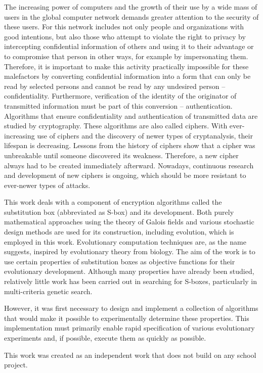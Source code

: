 %
%
%
%
%
%
The increasing power of computers and the growth of their use by a wide mass of users in the global computer network
demands greater attention to the security of these users.
For this network includes
not only people and organizations with good intentions, but also those who attempt
to violate the right to privacy by intercepting confidential
information of others and using it to their advantage or to compromise that person in other ways, for example
by impersonating them. Therefore, it is important to make this activity practically impossible for these malefactors by converting confidential information
into a form that can only be read by selected persons and cannot be read by any undesired person
-- confidentiality.
Furthermore, verification of the identity of the originator of transmitted information must be part of this conversion -- authentication.
Algorithms that ensure confidentiality and authentication of transmitted data are studied by cryptography.
These algorithms are also called ciphers. With ever-increasing use of ciphers and the discovery of newer
types of cryptanalysis, their lifespan is decreasing.
Lessons from the history of ciphers show that a cipher was unbreakable until
someone discovered its weakness. Therefore, a new cipher always had to be created immediately afterward.
Nowadays, continuous research and development of new ciphers is ongoing, which should be more resistant
to ever-newer types of attacks.

This work deals with a component of encryption algorithms called the substitution box
(abbreviated as S-box) and its development. Both purely
mathematical approaches using the theory of Galois fields and various stochastic design methods are used for its construction,
including evolution, which is employed in this work.
Evolutionary computation techniques are, as the name suggests, inspired by evolutionary theory from biology.
The aim of the work is to use certain properties of substitution boxes
as objective functions for their evolutionary development.
Although many properties have already been studied, relatively little work has been carried out
in searching for S-boxes, particularly in multi-criteria genetic search.

However, it was first necessary to design and implement a collection of algorithms
that would make it possible to experimentally determine these properties.
This implementation must primarily enable rapid specification of various evolutionary experiments and, if possible,
execute them as quickly as possible.

This work was created as an independent work that does not build on any school project.
